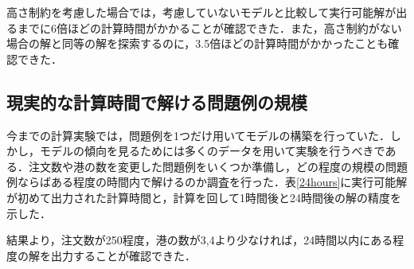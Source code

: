 \documentclass[a4j,11pt,twocolumn]{jsarticle}
\begin{document}
高さ制約を考慮した場合では，考慮していないモデルと比較して実行可能解が出るまでに6倍ほどの計算時間がかかることが確認できた．また，高さ制約がない場合の解と同等の解を探索するのに，3.5倍ほどの計算時間がかかったことも確認できた．


\subsection{現実的な計算時間で解ける問題例の規模}
今までの計算実験では，問題例を1つだけ用いてモデルの構築を行っていた．しかし，モデルの傾向を見るためには多くのデータを用いて実験を行うべきである．注文数や港の数を変更した問題例をいくつか準備し，どの程度の規模の問題例ならばある程度の時間内で解けるのか調査を行った．表\ref{24hours}に実行可能解が初めて出力された計算時間と，計算を回して1時間後と24時間後の解の精度を示した．

結果より，注文数が250程度，港の数が3,4より少なければ，24時間以内にある程度の解を出力することが確認できた．
\end{document}
